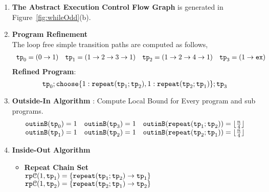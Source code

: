   \begin{enumerate}
    \item  \textbf{The Abstract Execution Control Flow Graph} is generated in Figure~\ref{fig:whileOdd}(b).
    \item \textbf{Program Refinement}
    \\
    The loop free simple transition paths are computed as follows,
    \[
    \begin{array}{llll}
      \mathtt{tp}_0 = (0 \to 1)
      &
      \mathtt{tp}_1 = (1 \to 2 \to 3 \to 1)
      &
      \mathtt{tp}_2 = (1 \to 2 \to 4 \to 1)
      &
      \mathtt{tp}_3 = (1 \to \mathtt{ex})
    \end{array}
    \]
  \textbf{Refined Program}:
  \[
    \tpath_0 ; \rpchoose{1: \rprepeat(\tpath_1; \tpath_2) , 
    1: \rprepeat(\tpath_2; \tpath_1)}; \tpath_3
    \]
  \item \textbf{Outside-In Algorithm} : Compute Local Bound for Every program and sub programs.
  \[
    \begin{array}{lll}
      \mathtt{outinB}(\mathtt{tp}_0) = 1
      &
      \mathtt{outinB}(\mathtt{tp}_3) = 1
      &
      \mathtt{outinB}(\mathtt{repeat}(\mathtt{tp}_1; \mathtt{tp}_2)) = \lfloor \frac{n}{4} \rfloor
      \\
      \mathtt{outinB}(\mathtt{tp}_1) = 1 
      &
      \mathtt{outinB}(\mathtt{tp}_2) = 1 
      &
      \mathtt{outinB}(\mathtt{repeat}(\mathtt{tp}_2; \mathtt{tp}_1)) = \lfloor \frac{n}{4} \rfloor
    \end{array}
    \]
  \item \textbf{Inside-Out Algorithm}
  \begin{itemize}
    \item \textbf{Repeat Chain Set}
    \\
    $\mathtt{rp}\mathcal{C}(1, \mathtt{tp}_1) = \{ \mathtt{repeat}(\mathtt{tp}_1; \mathtt{tp}_2) \to \mathtt{tp}_1\}$ \\
    $\mathtt{rp}\mathcal{C}(1, \mathtt{tp}_2) = \{ \mathtt{repeat}(\mathtt{tp}_2; \mathtt{tp}_1) \to \mathtt{tp}_2\}$ \\

\end{itemize}
\end{enumerate}
